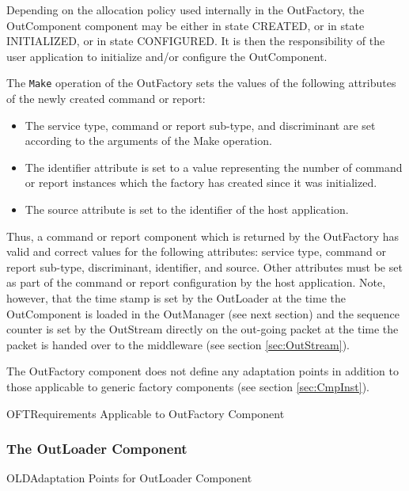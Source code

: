\documentclass{pnp_article}
\begin{document}
Depending on the allocation policy used internally in the OutFactory, the OutComponent component may be either in state CREATED, or in state INITIALIZED, or in state CONFIGURED. It is then the responsibility of the user application to initialize and/or configure the OutComponent.

The \texttt{Make} operation of the OutFactory sets the values of the following attributes of the newly created command or report:
\begin{itemize}
\item The service type, command or report sub-type, and discriminant are set according to the arguments of the Make operation.
\item The identifier attribute is set to a value representing the number of command or report instances which the factory has created since it was initialized.
\item The source attribute is set to the identifier of the host application.
\end{itemize}

Thus, a command or report component which is returned by the OutFactory has valid and correct values for the following attributes: service type, command or report sub-type,  discriminant,  identifier, and source. Other attributes must be set as part of the command or report configuration by the host application. Note, however, that the time stamp is set by the OutLoader at the time the OutComponent is loaded in the OutManager (see next section) and the sequence counter is set by the OutStream directly on the out-going packet at the time the packet is handed over to the middleware (see section \ref{sec:OutStream}).

The OutFactory component does not define any adaptation points in addition to those applicable to generic factory components (see section \ref{sec:CmpInst}). 

\begin{crReq}{OFT}{Requirements Applicable to OutFactory Component}
\end{crReq}

\subsubsection{The OutLoader Component}\label{sec:OutLoader}


\begin{crAp}{OLD}{Adaptation Points for OutLoader Component}
\end{crAp}
\end{document}
